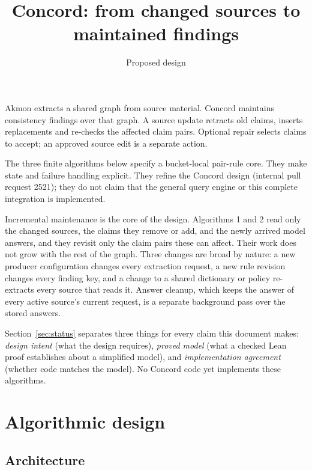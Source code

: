 \documentclass[11pt]{article}
\title{Concord: from changed sources to maintained findings}
\author{}
\date{Proposed design}
\begin{document}
\maketitle

Akmon extracts a shared graph from source material. Concord maintains consistency
findings over that graph. A source update retracts old claims, inserts replacements
and re-checks the affected claim pairs. Optional repair selects claims to accept; an
approved source edit is a separate action.

The three finite algorithms below specify a bucket-local pair-rule core. They
make state and failure handling explicit. They refine the
Concord design (internal pull request 2521); they do not claim
that the general query engine or this complete integration is implemented.

Incremental maintenance is the core of the design. Algorithms 1 and 2 read only
the changed sources, the claims they remove or add, and the newly arrived model
answers, and they revisit only the claim pairs these can affect. Their work does not
grow with the rest of the graph. Three changes are broad by nature: a new
producer configuration changes every extraction request, a new rule revision
changes every finding key, and a change to a shared dictionary or policy
re-extracts every source that reads it. Answer cleanup, which keeps the answer
of every active source's current request, is a separate background pass over
the stored answers.

Section~\ref{sec:status} separates three things for every claim this document
makes: \emph{design intent} (what the design requires), \emph{proved model}
(what a checked Lean proof establishes about a simplified model), and
\emph{implementation agreement} (whether code matches the model). No Concord
code yet implements these algorithms.

\section{Algorithmic design}

\subsection{Architecture}
\end{document}
